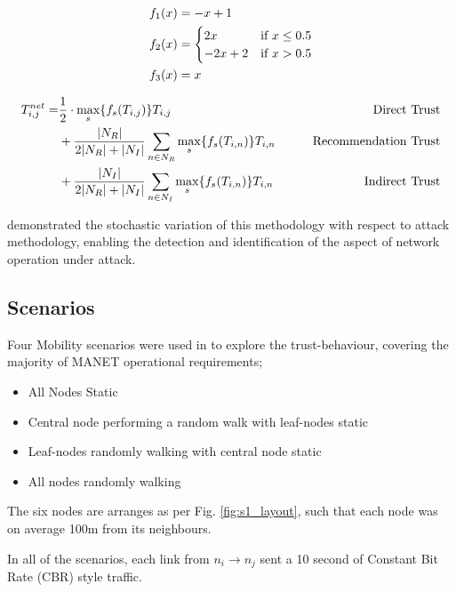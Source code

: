 \documentclass[runningheads,a4paper]{llncs}
\begin{document}
\begin{align}
  \label{eq:whitenization}
  f_1(x) &= -x+1\notag\\
  f_2(x) &= 
  \begin{cases}
    2x & \text{if }x\leq 0.5\\
    -2x+2 & \text{if }x>0.5
  \end{cases}\\
  f_3(x) &= x\notag
\end{align}

\begin{align}
  \label{eq:networkeffects}
  T_{i,j}^{net}=&\frac{1}{2} \cdot \max_s\{f_s(T_{i,j})\} T_{i,j}&\qquad \text{Direct Trust}\notag \\
  &+ \frac{|N_R| }{2|N_R| + |N_I|}\sum_{n \in N_R} \max_s\{f_s(T_{i,n})\} T_{i,n}&\qquad \text{Recommendation Trust}\notag\\
  &+ \frac{|N_I| }{2|N_R| + |N_I|}\sum_{n \in N_I} \max_s\{f_s(T_{i,n})\} T_{i,n} &\qquad \text{Indirect Trust}
\end{align}

\cite{Guo11} demonstrated the stochastic variation of this methodology with respect to attack methodology, enabling the detection and identification of the aspect of network operation under attack.

\subsection{Scenarios}

Four Mobility scenarios were used in \cite{Guo11} to explore the trust-behaviour, covering the majority of MANET operational requirements; 

\begin{itemize}
  \item All Nodes Static
  \item Central node performing a random walk with leaf-nodes static
  \item Leaf-nodes randomly walking with central node static
  \item All nodes randomly walking
\end{itemize}

The six nodes are arranges as per Fig. \ref{fig:s1_layout}, such that each node was on average 100m from its neighbours.

In all of the scenarios, each link from $n_i \rightarrow n_j$ sent a 10 second of Constant Bit Rate (CBR) style traffic.
\end{document}
